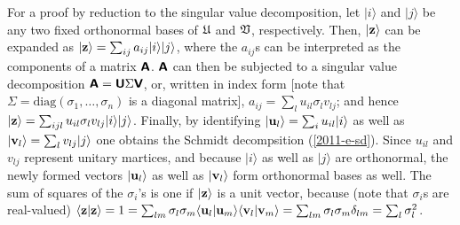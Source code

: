 {\color{OliveGreen}
\bproof
For a proof by reduction to the singular value decomposition,
let
$\vert i\rangle$
and
$\vert j\rangle$
be any two fixed orthonormal bases of $ {\frak U}$ and $ {\frak V}$, respectively.
Then,
$\vert {\bf z}\rangle $
can be expanded as
$\vert {\bf z}\rangle  = \sum_{ij}a_{ij} \vert i\rangle \vert j\rangle$,
where the $a_{ij}$s can be interpreted as the components of a matrix
$\textsf{\textbf{A}}$.
$\textsf{\textbf{A}}$ can then be subjected to a
singular value decomposition
$\textsf{\textbf{A}} = \textsf{\textbf{U}} \Sigma \textsf{\textbf{V}}$,
or, written in index form [note that $\Sigma=\textrm{diag}(\sigma_1, \ldots, \sigma_n)$ is a diagonal matrix],
$a_{ij}= \sum_l u_{il}\sigma_l v_{lj}$;
and hence  $\vert {\bf z}\rangle  = \sum_{ijl} u_{il}\sigma_l v_{lj}\vert i\rangle \vert j\rangle$.
Finally, by identifying
$\vert {\bf u}_l  \rangle = \sum_i u_{il} \vert i\rangle$
as well as
$\vert {\bf v}_l  \rangle = \sum_l v_{lj} \vert j\rangle$
one obtains the Schmidt decompsition (\ref{2011-e-sd}).
Since $u_{il}$ and $v_{ lj}$ represent unitary martices,
and because
 $\vert i\rangle$ as well as
 $\vert j\rangle$
are orthonormal,
the newly formed vectors
$\vert {\bf u}_l \rangle$
as well as
$\vert {\bf v}_l  \rangle$
form orthonormal bases as well.
The sum of squares of the $\sigma_i$'s is one if  $\vert {\bf z}\rangle $ is a unit vector,
because  (note that $\sigma_i$s are real-valued)
 $\langle {\bf z}\vert {\bf z}\rangle =1
=   \sum_{lm} \sigma_l \sigma_m   \langle {\bf u}_l  \vert  {\bf u}_m  \rangle   \langle  {\bf v}_l  \vert  {\bf v}_m  \rangle
=   \sum_{lm} \sigma_l \sigma_m  \delta_{lm}
=   \sum_{l} \sigma_l^2
$.
\eproof
}

